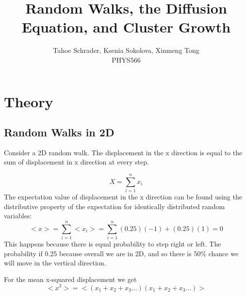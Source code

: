 \documentclass[12pt]{article}
\title{Random Walks, the Diffusion Equation, and Cluster Growth}
\author{Tahoe Schrader, Ksenia Sokolova, Xinmeng Tong \\PHYS566}
\date{}
\begin{document}
\maketitle


\section{Theory}
\label{sec:theory}

\subsection{Random Walks in 2D}
Consider a 2D random walk. The displacement in the x direction is equal to the sum of displacement in x direction at every step. 

\begin{equation}
    X=\sum_{i=1}^{n} x_i
\end{equation}
The expectation value of displacement in the x direction can be found using the distributive property of the expectation for identically distributed random variables:
\begin{equation}
    <x>=\sum_{i=1}^{n} <x_i>=\sum_{i=1}^{n} (0.25)(-1)+(0.25)(1)=0
\end{equation}
This happens because there is equal probability to step right or left. The probability if 0.25 because overall we are in 2D, and so there is 50\% chance we will move in the vertical direction.

For the mean x-squared displacement we get
\begin{equation}
    <x^2>=<(x_1+x_2+x_3...)(x_1+x_2+x_3...)>
\end{equation}
\end{document}

